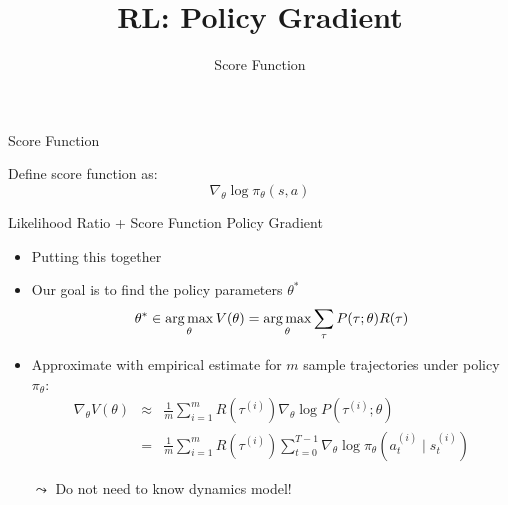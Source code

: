 


\title[Reinforcement Learning: Big Picture]{RL: Policy Gradient}
\subtitle{Score Function}




	
	\maketitle

\begin{frame}[c]{Score Function}


Define score function as:
$$\nabla_\theta \log \pi_\theta (s,a) $$


\end{frame}
\begin{frame}[c]{Likelihood Ratio + Score Function Policy Gradient}
	
	\begin{itemize}
		\item Putting this together
		\item Our goal is to find the policy parameters $\theta^*$
		$$\theta^* \in \operatorname*{arg\,max}_{\theta} V(\theta) = \operatorname*{arg\,max}_{\theta}\sum_{\tau} P(\tau; \theta) R(\tau) $$
		\item Approximate with empirical estimate for $m$ sample trajectories under
		policy $\pi_\theta$:
		\begin{eqnarray}
		\nabla_\theta V(\theta) &\approx& \frac{1}{m} \sum_{i=1}^{m} R(\tau^{(i)}) \nabla_\theta \log P(\tau^{(i)}; \theta) \nonumber\\
		&=& \frac{1}{m} \sum_{i=1}^{m} R(\tau^{(i)}) \sum_{t=0}^{T-1} \nabla_\theta \log \pi_\theta (a_t^{(i)} \mid s_t^{(i)})
		\end{eqnarray}
		\item[$\leadsto$] Do not need to know dynamics model!
		
	\end{itemize}
	
\end{frame}

